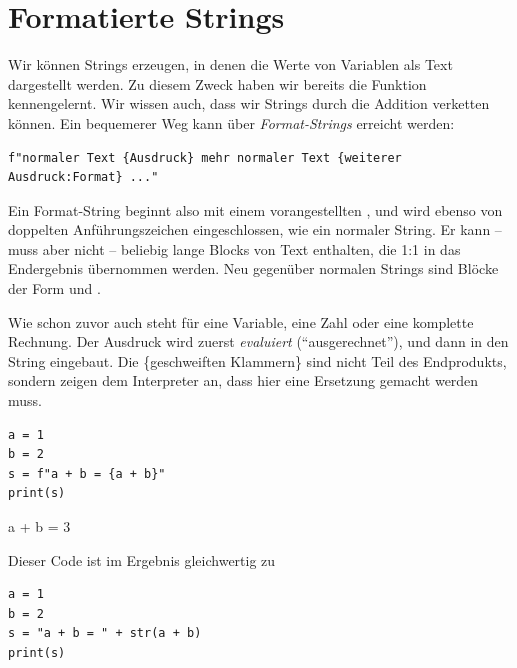 \section{Formatierte Strings}
Wir können Strings erzeugen, in denen die Werte von Variablen als Text dargestellt werden. Zu diesem Zweck haben wir bereits die Funktion  kennengelernt. Wir wissen auch, dass wir Strings durch die Addition verketten können. Ein bequemerer Weg kann über \emph{Format-Strings} erreicht werden:
\begin{codebox}
\begin{verbatim}
f"normaler Text {Ausdruck} mehr normaler Text {weiterer Ausdruck:Format} ..."
\end{verbatim}
\end{codebox}

Ein Format-String beginnt also mit einem vorangestellten , und wird ebenso von doppelten Anführungszeichen  eingeschlossen, wie ein normaler String. Er kann -- muss aber nicht -- beliebig lange Blocks von Text enthalten, die 1:1 in das Endergebnis übernommen werden. Neu gegenüber normalen Strings sind Blöcke der Form  und .

Wie schon zuvor auch steht  für eine Variable, eine Zahl oder eine komplette Rechnung. Der Ausdruck wird zuerst \emph{evaluiert} (\enquote{ausgerechnet}), und dann in den String eingebaut. Die \{geschweiften Klammern\} sind nicht Teil des Endprodukts, sondern zeigen dem Interpreter an, dass hier eine Ersetzung gemacht werden muss.

\begin{codebox}
\begin{verbatim}
a = 1
b = 2
s = f"a + b = {a + b}"
print(s)
\end{verbatim}
\end{codebox}

\begin{cmdbox}
a + b = 3
\end{cmdbox}

Dieser Code ist im Ergebnis gleichwertig zu 
\begin{codebox}
\begin{verbatim}
a = 1
b = 2
s = "a + b = " + str(a + b)
print(s)
\end{verbatim}
\end{codebox}

